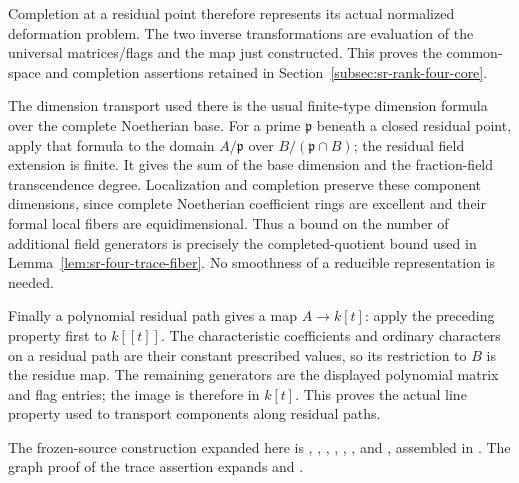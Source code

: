 Completion at a residual point therefore represents its
actual normalized deformation problem.
The two inverse transformations are evaluation of the
universal matrices/flags and the map just constructed.
This proves the common-space and completion assertions
retained in Section~\ref{subsec:sr-rank-four-core}.

The dimension transport used there is the usual finite-type
dimension formula over the complete Noetherian base.
For a prime \(\mathfrak p\) beneath a closed residual point,
apply that formula to the domain \(A/\mathfrak p\)
over \(B/(\mathfrak p\cap B)\); the residual field extension
is finite. It gives the sum of the base dimension and the
fraction-field transcendence degree.
Localization and completion preserve these component
dimensions, since complete Noetherian coefficient rings are
excellent and their formal local fibers are equidimensional.
Thus a bound on the number of additional field generators
is precisely the completed-quotient bound used in
Lemma~\ref{lem:sr-four-trace-fiber}.
No smoothness of a reducible representation is needed.

Finally a polynomial residual path gives a map
\(A\to k[t]\): apply the preceding property first to
\(k[[t]]\). The characteristic coefficients and ordinary
characters on a residual path are their constant prescribed
values, so its restriction to \(B\) is the residue map.
The remaining generators are the displayed polynomial
matrix and flag entries; the image is therefore in
\(k[t]\). This proves the actual line property used to
transport components along residual paths.

The frozen-source construction expanded here is
,
, , ,
, , and ,
assembled in
.
The graph proof of the trace assertion expands
 and .
